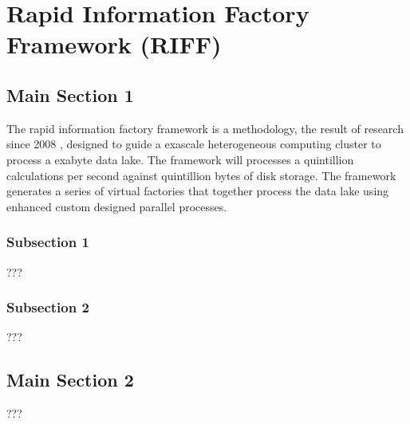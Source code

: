 
\chapter{Rapid Information Factory Framework (RIFF)} %

\label{Chapter04} %



\section{Main Section 1}

The rapid information factory framework is a methodology, the result of research since 2008 , designed to guide a exascale \cite{bergman2008exascale} heterogeneous computing cluster to process a exabyte data lake. The framework will processes a quintillion calculations per second against quintillion bytes of disk storage. The framework generates a series of virtual factories that together process the data lake using enhanced custom designed parallel processes.

\subsection{Subsection 1}

???


\subsection{Subsection 2}

???


\section{Main Section 2}

???
